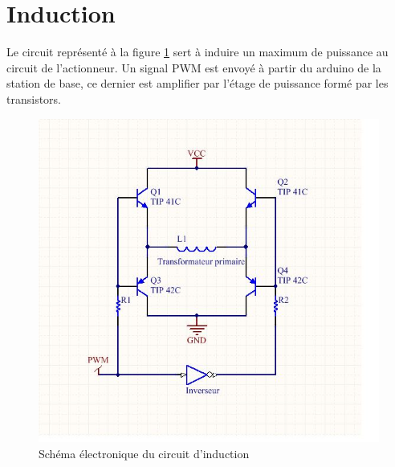 \section{Induction}

Le circuit représenté à la figure \ref{fig:induction} sert à induire un maximum de puissance au circuit de l'actionneur.
Un signal PWM est envoyé à partir du arduino de la station de base, ce dernier est amplifier par l'étage de puissance formé par les transistors.

\begin{figure}[ht]
  \centering
  \includegraphics[scale=0.4]{resources/induction.png}
  \caption{Schéma électronique du circuit d'induction}
  \label{fig:induction}
\end{figure}
